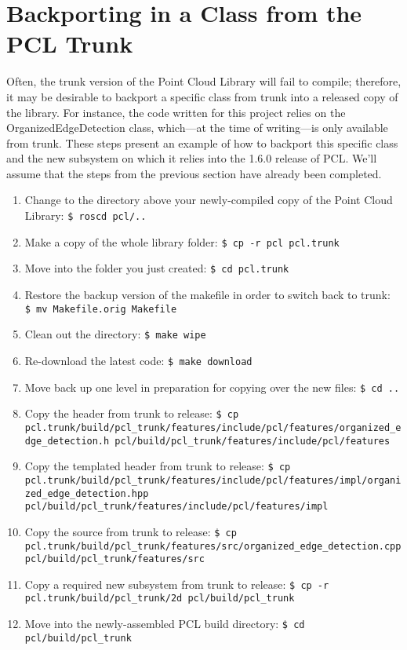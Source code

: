 \documentclass[12pt]{report}
\begin{document}
\section{Backporting in a Class from the PCL Trunk}
Often, the trunk version of the Point Cloud Library will fail to compile; therefore, it may be desirable to backport a specific class from trunk into a released copy of the library.  For instance, the code written for this project relies on the OrganizedEdgeDetection class, which---at the time of writing---is only available from trunk.  These steps present an example of how to backport this specific class and the new subsystem on which it relies into the 1.6.0 release of PCL.  We'll assume that the steps from the previous section have already been completed.
\begin{enumerate}
\item{Change to the directory above your newly-compiled copy of the Point Cloud Library: \texttt{\$\ roscd pcl/..}}
\item{Make a copy of the whole library folder: \texttt{\$\ cp -r pcl pcl.trunk}}
\item{Move into the folder you just created: \texttt{\$\ cd pcl.trunk}}
\item{Restore the backup version of the makefile in order to switch back to trunk: \texttt{\$\ mv Makefile.orig Makefile}}
\item{Clean out the directory: \texttt{\$\ make wipe}}
\item{Re-download the latest code: \texttt{\$\ make download}}
\item{Move back up one level in preparation for copying over the new files: \texttt{\$\ cd ..}}
\item{Copy the header from trunk to release: \texttt{\$\ cp pcl.trunk/build/pcl\_trunk/features/include/pcl/features/organized\_edge\_detection.h pcl/build/pcl\_trunk/features/include/pcl/features}}
\item{Copy the templated header from trunk to release: \texttt{\$\ cp pcl.trunk/build/pcl\_trunk/features/include/pcl/features/impl/organized\_edge\_detection.hpp pcl/build/pcl\_trunk/features/include/pcl/features/impl}}
\item{Copy the source from trunk to release: \texttt{\$\ cp pcl.trunk/build/pcl\_trunk/features/src/organized\_edge\_detection.cpp pcl/build/pcl\_trunk/features/src}}
\item{Copy a required new subsystem from trunk to release: \texttt{\$\ cp -r pcl.trunk/build/pcl\_trunk/2d pcl/build/pcl\_trunk}}
\item{Move into the newly-assembled PCL build directory: \texttt{\$\ cd pcl/build/pcl\_trunk}}

\end{enumerate}
\end{document}
